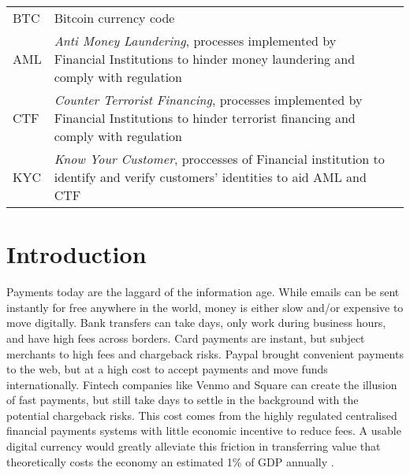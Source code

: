 \documentclass[12pt]{article} %
\begin{document}
\begin{tabular}{p{3 cm}ll} %
BTC & Bitcoin currency code\\
AML & \textit{Anti Money Laundering}, processes implemented by Financial Institutions to hinder money laundering and comply with regulation\\
CTF & \textit{Counter Terrorist Financing}, processes implemented by Financial Institutions to hinder terrorist financing and comply with regulation\\
KYC & \textit{Know Your Customer}, proccesses of Financial institution to identify and verify customers' identities to aid AML and CTF
\end{tabular}


\pagebreak

\tableofcontents
\newpage

\listoffigures
\pagebreak

\listoftables
\pagebreak

\section{Introduction} \label{sec:1}

Payments today are the laggard of the information age. While emails can be sent instantly for free anywhere in the world, money is either slow and/or expensive to move digitally. Bank transfers can take days, only work during business hours, and have high fees across borders. Card payments are instant, but subject merchants to high fees and chargeback risks. Paypal brought convenient payments to the web, but at a high cost to accept payments and move funds internationally. Fintech companies like Venmo and Square can create the illusion of fast payments, but still take days to settle in the background with the potential chargeback risks. This cost comes from the highly regulated centralised financial payments systems with little economic incentive to reduce fees. A usable digital currency would greatly alleviate this friction in transferring value that theoretically costs the economy an estimated 1\% of GDP annually \cite{kaarmann2013cost}.
\end{document}
